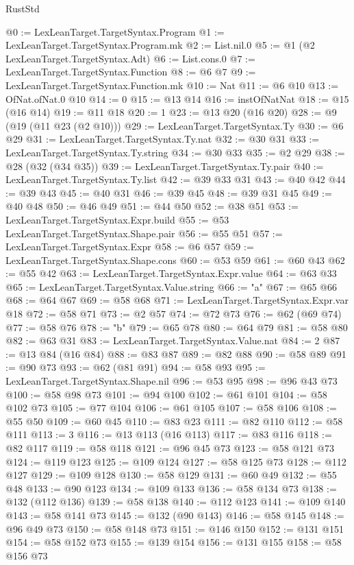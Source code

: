 \begin{lexlean}{RustStd}
\begin{coremodule}
@0 := LexLeanTarget.TargetSyntax.Program
@1 := LexLeanTarget.TargetSyntax.Program.mk
@2 := List.nil.{0}
@5 := @1 (@2 LexLeanTarget.TargetSyntax.Adt)
@6 := List.cons.{0}
@7 := LexLeanTarget.TargetSyntax.Function
@8 := @6 @7
@9 := LexLeanTarget.TargetSyntax.Function.mk
@10 := Nat
@11 := @6 @10
@13 := OfNat.ofNat.{0} @10
@14 := 0
@15 := @13 @14
@16 := instOfNatNat
@18 := @15 (@16 @14)
@19 := @11 @18
@20 := 1
@23 := @13 @20 (@16 @20)
@28 := @9 (@19 (@11 @23 (@2 @10)))
@29 := LexLeanTarget.TargetSyntax.Ty
@30 := @6 @29
@31 := LexLeanTarget.TargetSyntax.Ty.nat
@32 := @30 @31
@33 := LexLeanTarget.TargetSyntax.Ty.string
@34 := @30 @33
@35 := @2 @29
@38 := @28 (@32 (@34 @35))
@39 := LexLeanTarget.TargetSyntax.Ty.pair
@40 := LexLeanTarget.TargetSyntax.Ty.list
@42 := @39 @33 @31
@43 := @40 @42
@44 := @39 @43
@45 := @40 @31
@46 := @39 @45
@48 := @39 @31 @45
@49 := @40 @48
@50 := @46 @49
@51 := @44 @50
@52 := @38 @51
@53 := LexLeanTarget.TargetSyntax.Expr.build
@55 := @53 LexLeanTarget.TargetSyntax.Shape.pair
@56 := @55 @51
@57 := LexLeanTarget.TargetSyntax.Expr
@58 := @6 @57
@59 := LexLeanTarget.TargetSyntax.Shape.cons
@60 := @53 @59
@61 := @60 @43
@62 := @55 @42
@63 := LexLeanTarget.TargetSyntax.Expr.value
@64 := @63 @33
@65 := LexLeanTarget.TargetSyntax.Value.string
@66 := "a"
@67 := @65 @66
@68 := @64 @67
@69 := @58 @68
@71 := LexLeanTarget.TargetSyntax.Expr.var @18
@72 := @58 @71
@73 := @2 @57
@74 := @72 @73
@76 := @62 (@69 @74)
@77 := @58 @76
@78 := "b"
@79 := @65 @78
@80 := @64 @79
@81 := @58 @80
@82 := @63 @31
@83 := LexLeanTarget.TargetSyntax.Value.nat
@84 := 2
@87 := @13 @84 (@16 @84)
@88 := @83 @87
@89 := @82 @88
@90 := @58 @89
@91 := @90 @73
@93 := @62 (@81 @91)
@94 := @58 @93
@95 := LexLeanTarget.TargetSyntax.Shape.nil
@96 := @53 @95
@98 := @96 @43 @73
@100 := @58 @98 @73
@101 := @94 @100
@102 := @61 @101
@104 := @58 @102 @73
@105 := @77 @104
@106 := @61 @105
@107 := @58 @106
@108 := @55 @50
@109 := @60 @45
@110 := @83 @23
@111 := @82 @110
@112 := @58 @111
@113 := 3
@116 := @13 @113 (@16 @113)
@117 := @83 @116
@118 := @82 @117
@119 := @58 @118
@121 := @96 @45 @73
@123 := @58 @121 @73
@124 := @119 @123
@125 := @109 @124
@127 := @58 @125 @73
@128 := @112 @127
@129 := @109 @128
@130 := @58 @129
@131 := @60 @49
@132 := @55 @48
@133 := @90 @123
@134 := @109 @133
@136 := @58 @134 @73
@138 := @132 (@112 @136)
@139 := @58 @138
@140 := @112 @123
@141 := @109 @140
@143 := @58 @141 @73
@145 := @132 (@90 @143)
@146 := @58 @145
@148 := @96 @49 @73
@150 := @58 @148 @73
@151 := @146 @150
@152 := @131 @151
@154 := @58 @152 @73
@155 := @139 @154
@156 := @131 @155
@158 := @58 @156 @73

\end{coremodule}
\end{lexlean}
